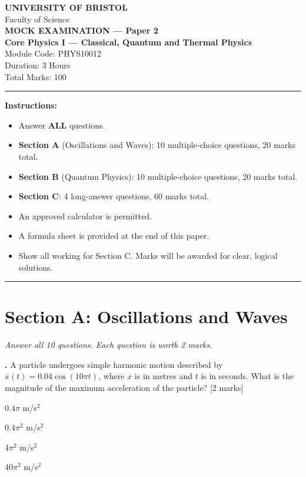 \documentclass[12pt,a4paper]{article}
\newcounter{mcqcounter}
\newcommand{\mcq}[1]{%
  \stepcounter{mcqcounter}%
  \vspace{0.3cm}%
  \noindent\textbf{\themcqcounter.} #1 \hfill [2 marks]%
  \vspace{0.1cm}%
}
\begin{document}
\begin{center}
{\Large\textbf{UNIVERSITY OF BRISTOL}}\\[0.3cm]
{\large Faculty of Science}\\[0.5cm]
{\Large\textbf{MOCK EXAMINATION --- Paper 2}}\\[0.3cm]
{\large\textbf{Core Physics I --- Classical, Quantum and Thermal Physics}}\\[0.2cm]
{\large Module Code: PHYS10012}\\[0.5cm]
{\large Duration: 3 Hours}\\[0.3cm]
{\large Total Marks: 100}\\[0.5cm]
\end{center}

\noindent\rule{\textwidth}{0.4pt}

\vspace{0.3cm}
\noindent\textbf{Instructions:}
\begin{itemize}[itemsep=0.1cm]
\item Answer \textbf{ALL} questions.
\item \textbf{Section A} (Oscillations and Waves): 10 multiple-choice questions, 20 marks total.
\item \textbf{Section B} (Quantum Physics): 10 multiple-choice questions, 20 marks total.
\item \textbf{Section C}: 4 long-answer questions, 60 marks total.
\item An approved calculator is permitted.
\item A formula sheet is provided at the end of this paper.
\item Show all working for Section C. Marks will be awarded for clear, logical solutions.
\end{itemize}

\noindent\rule{\textwidth}{0.4pt}
\newpage

\section*{Section A: Oscillations and Waves}
\noindent\textit{Answer all 10 questions. Each question is worth 2 marks.}\\[0.3cm]

\setcounter{mcqcounter}{0}

\mcq{A particle undergoes simple harmonic motion described by $x(t) = 0.04\cos(10\pi t)$, where $x$ is in metres and $t$ is in seconds. What is the magnitude of the maximum acceleration of the particle?}
\begin{choices}
\item $0.4\pi$ m/s$^2$
\item $0.4\pi^2$ m/s$^2$
\item $4\pi^2$ m/s$^2$
\item $40\pi^2$ m/s$^2$
\end{choices}
\end{document}
